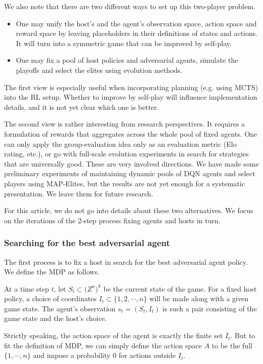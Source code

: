\documentclass{article}
\theoremstyle{plain}
\theoremstyle{definition}
\theoremstyle{remark}
\begin{document}
We also note that there are two different ways to set up this two-player problem.

\begin{itemize}
    \item One may unify the host's and the agent's observation space, action space and reward space by leaving placeholders in their definitions of states and actions. It will turn into a symmetric game that can be improved by self-play.
    \item One may fix a pool of host policies and adversarial agents, simulate the playoffs and select the elites using evolution methods.
\end{itemize}

The first view is especially useful when incorporating planning (e.g. using MCTS) into the RL setup. Whether to improve by self-play will influence implementation details, and it is not yet clear which one is better.

The second view is rather interesting from research perspectives. It requires a formulation of rewards that aggregates across the whole pool of fixed agents. One can only apply the group-evaluation idea only as an evaluation metric (Elo rating, etc.), or go with full-scale evolution experiments in search for strategies that are universally good. These are very involved directions. We have made some preliminary experiments of maintaining dynamic pools of DQN agents and select players using MAP-Elites, but the results are not yet enough for a systematic presentation. We leave them for future research.

For this article, we do not go into details about these two alternatives. We focus on the iterations of the 2-step process fixing agents and hosts in turn.

\subsubsection{Searching for the best adversarial agent}
The first process is to fix a host in search for the best adversarial agent policy. We define the MDP as follows.

At a time step $t$, let $S_t \subset \mathbb (Z^n)^k$ be the current state of the game. For a fixed host policy, a choice of coordinates $I_t\subset \{1,2,\cdots,n\}$ will be made along with a given game state. The agent’s observation $s_t = (S_t, I_t)$ is such a pair consisting of the game state and the host's choice. 

Strictly speaking, the action space of the agent is exactly the finite set $I_t$. But to fit the definition of MDP, we can simply define the action space $A$ to be the full $\{1,\cdots,n\}$ and impose a probability $0$ for actions outside $I_t$.
\end{document}
